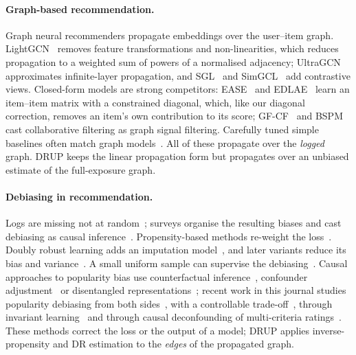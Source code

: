 \paragraph{Graph-based recommendation.}
Graph neural recommenders propagate embeddings over the user--item graph.
LightGCN~\citep{he2020lightgcn} removes feature transformations and
non-linearities, which reduces propagation to a weighted sum of powers of a
normalised adjacency; UltraGCN~\citep{mao2021ultragcn} approximates
infinite-layer propagation, and SGL~\citep{wu2021sgl} and
SimGCL~\citep{yu2022simgcl} add contrastive views. Closed-form models are strong
competitors: EASE~\citep{steck2019ease} and EDLAE~\citep{steck2020edlae} learn an
item--item matrix with a constrained diagonal, which, like our diagonal
correction, removes an item's own contribution to its score;
GF-CF~\citep{shen2021gfcf} and BSPM~\citep{choi2023bspm} cast collaborative
filtering as graph signal filtering. Carefully tuned simple baselines often
match graph models~\citep{anelli2023myth}. All of these propagate over the
\emph{logged} graph. DRUP keeps the linear propagation form but propagates over
an unbiased estimate of the full-exposure graph.

\paragraph{Debiasing in recommendation.}
Logs are missing not at random~\citep{marlin2009collaborative}; surveys organise
the resulting biases and cast debiasing as causal
inference~\citep{chen2023bias,gao2024causalsurvey}. Propensity-based methods
re-weight the loss~\citep{schnabel2016,swaminathan2015snips,saito2020unbiased}.
Doubly robust learning adds an imputation model~\citep{wang2019drjl}, and later
variants reduce its bias and variance~\citep{guo2021mrdr,dai2022gdr,li2023stabledr}.
A small uniform sample can supervise the debiasing~\citep{chen2021autodebias}.
Causal approaches to popularity bias use counterfactual
inference~\citep{wei2021macr}, confounder adjustment~\citep{zhang2021pda} or
disentangled representations~\citep{zheng2021dice}; recent work in this journal
studies popularity debiasing from both sides~\citep{boratto2021connecting}, with a
controllable trade-off~\citep{okamura2024flexibly}, through invariant
learning~\citep{bai2025invariant} and through causal deconfounding of
multi-criteria ratings~\citep{guo2026confounding}. These methods correct the loss
or the output of a model; DRUP applies inverse-propensity and DR estimation to the
\emph{edges} of the propagated graph.

